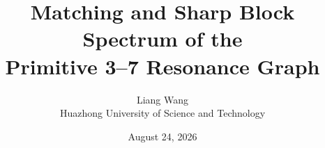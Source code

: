 \documentclass[11pt,a4paper]{article}
\title{Matching and Sharp Block Spectrum of the\\Primitive 3--7 Resonance Graph}
\author{Liang Wang\\Huazhong University of Science and Technology}
\date{August 24, 2026}
\theoremstyle{remark}\newtheorem{remark}[theorem]{Remark}
\begin{document}
\maketitle
\begin{abstract}\end{abstract}



\end{document}
